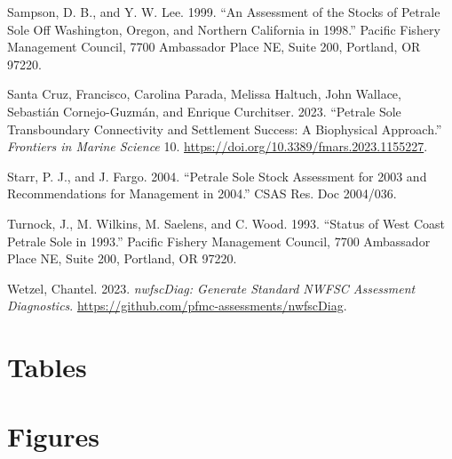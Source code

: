 \documentclass[
]{scrartcl}
\newlength{\cslhangindent}
\newenvironment{CSLReferences}[2] %
 {\begin{list}{}{%
  \setlength{\itemindent}{0pt}
  \setlength{\leftmargin}{0pt}
  \setlength{\parsep}{0pt}
  \ifodd #1
   \setlength{\leftmargin}{\cslhangindent}
   \setlength{\itemindent}{-1\cslhangindent}
  \fi
  \setlength{\itemsep}{#2\baselineskip}}}
 {\end{list}}
\begin{document}
\begin{CSLReferences}{1}{0}
Sampson, D. B., and Y. W. Lee. 1999. {``An Assessment of the Stocks of
Petrale Sole Off {Washington}, {Oregon}, and {Northern} {California} in
1998.''} Pacific Fishery Management Council, 7700 Ambassador Place NE,
Suite 200, Portland, OR 97220.

Santa Cruz, Francisco, Carolina Parada, Melissa Haltuch, John Wallace,
Sebastián Cornejo-Guzmán, and Enrique Curchitser. 2023. {``Petrale Sole
Transboundary Connectivity and Settlement Success: A Biophysical
Approach.''} \emph{Frontiers in Marine Science} 10.
\url{https://doi.org/10.3389/fmars.2023.1155227}.

Starr, P. J., and J. Fargo. 2004. {``Petrale Sole Stock Assessment for
2003 and Recommendations for Management in 2004.''} CSAS Res. Doc
2004/036.

Turnock, J., M. Wilkins, M. Saelens, and C. Wood. 1993. {``Status of
{West} {Coast} Petrale Sole in 1993.''} Pacific Fishery Management
Council, 7700 Ambassador Place NE, Suite 200, Portland, OR 97220.

Wetzel, Chantel. 2023. \emph{nwfscDiag: Generate Standard NWFSC
Assessment Diagnostics}.
\url{https://github.com/pfmc-assessments/nwfscDiag}.

\end{CSLReferences}

\newpage{}

\section{Tables}\label{tables}

\newpage{}

\section{Figures}\label{figures}
\end{document}
